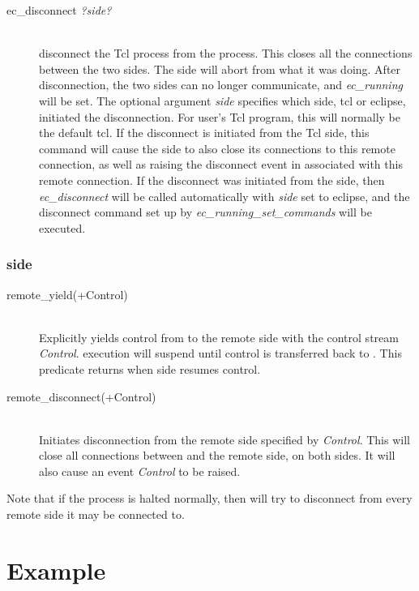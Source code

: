 \begin{description}
\item[ec_disconnect {\it ?side?}]\ \\
	disconnect the Tcl process from the {\eclipse} process. This closes
	all the connections between the two sides. The {\eclipse} side will
	abort from what it was doing. After disconnection, the
	two sides can no longer communicate, and {\it ec_running\/} will be
	set. The optional argument {\it side\/} specifies which side, tcl
	or eclipse,
	initiated the disconnection. For user's Tcl program, this will
	normally be the default tcl. If the disconnect is initiated from
	the Tcl side, this command will cause the {\eclipse} side to also
	close its connections to this remote connection, as well as
	raising the disconnect event in {\eclipse} associated with this
	remote connection. If the disconnect was initiated from
	the {\eclipse} side, then {\it ec_disconnect\/} will be called
	automatically with {\it side\/} set to eclipse, and the disconnect
	command set up by {\it ec_running_set_commands\/} will be executed.
\end{description}

\subsubsection{{\eclipse} side}

\begin{description}
\item[remote_yield(+Control)]\ \\
	Explicitly yields control from {\eclipse} to the remote side with
	the control stream {\it	Control}. {\eclipse} execution will suspend
	until control is transferred back to {\eclipse}. This predicate
	returns when {\eclipse} side resumes control.
	
\item[remote_disconnect(+Control)]\ \\
	Initiates disconnection from the remote side specified by {\it
	Control}. This will close all connections between {\eclipse} and
	the remote side, on both sides. It will also cause an event {\it
	Control} to be raised. 
\end{description}

Note that if the {\eclipse} process is halted normally, then {\eclipse}
will try to disconnect from every remote side it may be connected to.

\section{Example}


